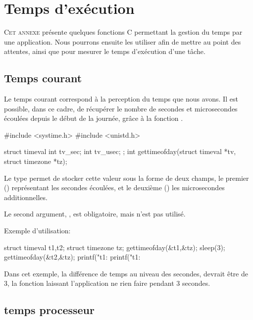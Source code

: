 
\chapter{Temps d'exécution}\label{sec:temps}
\startchapter

\lettrine[lines=3]{C}{et annexe} présente quelques fonctions C permettant la gestion du temps par une application. Nous pourrons ensuite les utiliser afin de mettre au point des attentes, ainsi que pour mesurer le temps d'exécution d'une tâche.

\section{Temps courant}

Le temps courant correspond à la perception du temps que nous avons. Il est possible, dans ce cadre, de récupérer le nombre de secondes et microsecondes écoulées depuis le début de la journée, grâce à la fonction .

\begin{codeblock}[title=Get Time Of The Day]
#include <systime.h>
#include <unistd.h>

struct timeval { int tv_sec; int tv_usec; };
int gettimeofday(struct timeval *tv, struct timezone *tz);
\end{codeblock}


Le type  permet de stocker cette valeur sous la forme de deux champs, le premier () représentant les secondes écoulées, et le deuxième () les microsecondes additionnelles.

Le second argument, , est obligatoire, mais n'est pas utilisé.

Exemple d'utilisation:

\begin{codeblock}
struct timeval t1,t2;
struct timezone tz;
gettimeofday(&t1,&tz);
sleep(3);
gettimeofday(&t2,&tz);
printf("t1: %
printf("t1: %
\end{codeblock}

Dans cet exemple, la différence de temps au niveau des secondes, devrait être de 3, la fonction  laissant l'application ne rien faire pendant 3 secondes.

\section{temps processeur}

